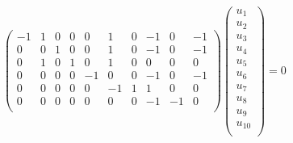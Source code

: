\documentclass{article}
\begin{document}
\vspace{5mm}
\\
\hspace*{10mm}
$
\begin{pmatrix}
	-1 & 1 & 0 & 0 & 0 & 1 & 0 & -1 & 0 & -1 \\
	0 & 0 & 1 & 0 & 0 & 1 & 0 & -1 & 0 & -1 \\
	0 & 1 & 0 & 1 & 0 & 1 & 0 & 0 & 0 & 0 \\
	0 & 0 & 0 & 0 & -1 & 0 & 0 & -1 & 0 & -1 \\
    0 & 0 & 0 & 0 & 0 & -1 & 1 & 1 & 0 & 0 \\
	0 & 0 & 0 & 0 & 0 & 0 & 0 & -1 & -1 & 0 \\ 
\end{pmatrix}
\begin{pmatrix}
	u_1 \\
	u_2 \\ 
	u_3 \\
	u_4 \\
	u_5 \\
	u_6 \\
	u_7 \\
	u_8 \\
	u_9 \\
	u_{10} \\
\end{pmatrix} = 0
$
\end{document}
